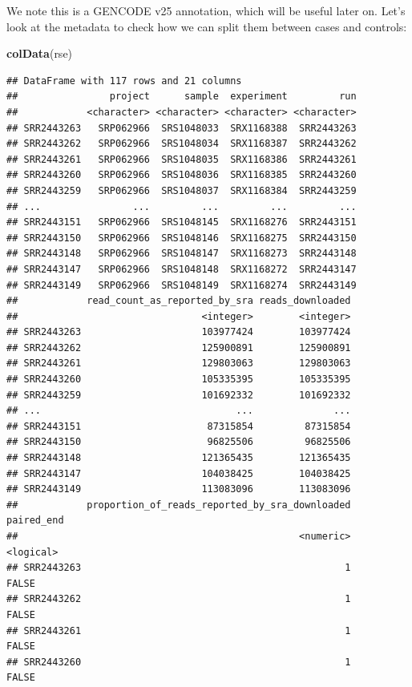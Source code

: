 \documentclass[9pt,a4paper,]{extarticle}
\newenvironment{Shaded}{\begin{snugshade}}{\end{snugshade}}
\newcommand{\KeywordTok}[1]{\textcolor[rgb]{0.13,0.29,0.53}{\textbf{#1}}}
\newcommand{\NormalTok}[1]{#1}
\begin{document}
We note this is a GENCODE v25 annotation, which will be useful later on.
Let's look at the metadata to check how we can split them between cases and controls:

\begin{Shaded}
\begin{Highlighting}[]
\KeywordTok{colData}\NormalTok{(rse)}
\end{Highlighting}
\end{Shaded}

\begin{verbatim}
## DataFrame with 117 rows and 21 columns
##                project      sample  experiment         run
##            <character> <character> <character> <character>
## SRR2443263   SRP062966  SRS1048033  SRX1168388  SRR2443263
## SRR2443262   SRP062966  SRS1048034  SRX1168387  SRR2443262
## SRR2443261   SRP062966  SRS1048035  SRX1168386  SRR2443261
## SRR2443260   SRP062966  SRS1048036  SRX1168385  SRR2443260
## SRR2443259   SRP062966  SRS1048037  SRX1168384  SRR2443259
## ...                ...         ...         ...         ...
## SRR2443151   SRP062966  SRS1048145  SRX1168276  SRR2443151
## SRR2443150   SRP062966  SRS1048146  SRX1168275  SRR2443150
## SRR2443148   SRP062966  SRS1048147  SRX1168273  SRR2443148
## SRR2443147   SRP062966  SRS1048148  SRX1168272  SRR2443147
## SRR2443149   SRP062966  SRS1048149  SRX1168274  SRR2443149
##            read_count_as_reported_by_sra reads_downloaded
##                                <integer>        <integer>
## SRR2443263                     103977424        103977424
## SRR2443262                     125900891        125900891
## SRR2443261                     129803063        129803063
## SRR2443260                     105335395        105335395
## SRR2443259                     101692332        101692332
## ...                                  ...              ...
## SRR2443151                      87315854         87315854
## SRR2443150                      96825506         96825506
## SRR2443148                     121365435        121365435
## SRR2443147                     104038425        104038425
## SRR2443149                     113083096        113083096
##            proportion_of_reads_reported_by_sra_downloaded paired_end
##                                                 <numeric>  <logical>
## SRR2443263                                              1      FALSE
## SRR2443262                                              1      FALSE
## SRR2443261                                              1      FALSE
## SRR2443260                                              1      FALSE

\end{verbatim}
\end{document}
